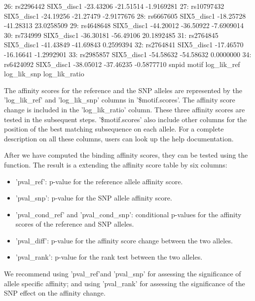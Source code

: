 \documentclass[a4paper,10pt]{article}
\begin{document}
\begin{Schunk}
\begin{Soutput}
26:  rs2296442 SIX5_disc1   -23.43206   -21.51514    -1.9169281
27: rs10797432 SIX5_disc1   -24.19256   -21.27479    -2.9177676
28:  rs6667605 SIX5_disc1   -18.25728   -41.28313    23.0258509
29:  rs4648648 SIX5_disc1   -44.20012   -36.50922    -7.6909014
30:   rs734999 SIX5_disc1   -36.30181   -56.49106    20.1892485
31:  rs2764845 SIX5_disc1   -41.43849   -41.69843     0.2599394
32:  rs2764841 SIX5_disc1   -17.46570   -16.16641    -1.2992901
33:  rs2985857 SIX5_disc1   -54.58632   -54.58632     0.0000000
34:  rs6424092 SIX5_disc1   -38.05012   -37.46235    -0.5877710
         snpid      motif log_lik_ref log_lik_snp log_lik_ratio
\end{Soutput}
\end{Schunk}


The affinity scores for the reference and the SNP alleles are represented by the 'log\_lik\_ref' and 'log\_lik\_snp' columns in '\$motif.scores'. The affinity score change is included in the 'log\_lik\_ratio' column. These three affinity scores are tested in the subsequent steps. '\$motif.scores' also include other columns for the position of the best matching subsequence on each allele. For a complete description on all these columns, users can look up the help documentation.

After we have computed the binding affinity scores, they can be tested using the  function. The result is a  extending the affinity score table by six columns: 

\begin{itemize}
  \item 'pval\_ref': p-value for the reference allele affinity score.
  \item 'pval\_snp': p-value for the SNP allele affinity score.
  \item 'pval\_cond\_ref' and 'pval\_cond\_snp': conditional p-values
    for the affinity scores of the reference and SNP alleles.
  \item 'pval\_diff': p-value for the affinity score change between the two alleles.
  \item 'pval\_rank': p-value for the rank test between the two alleles.
  \end{itemize}

We recommend using 'pval\_ref'and 'pval\_snp' for assessing the significance of allele specific affinity; and using 'pval\_rank' for assessing the significance of the SNP effect on the affinity change.
\end{document}
